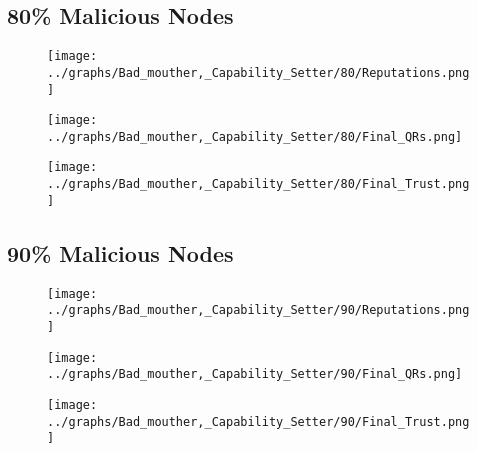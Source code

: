 \documentclass{article}
\begin{document}
  \begin{minipage}[t]{0.49\columnwidth}
    \subsection*{80\% Malicious Nodes}
        \begin{figure}[H]
            \centering
            \texttt{[image: ../graphs/Bad\_mouther,\_Capability\_Setter/80/Reputations.png]}
        \end{figure}
        \begin{figure}[H]
            \centering
            \texttt{[image: ../graphs/Bad\_mouther,\_Capability\_Setter/80/Final\_QRs.png]}
        \end{figure}
    \end{minipage}
    \begin{minipage}[t]{0.49\columnwidth}
        \begin{figure}[H]
            \centering
            \texttt{[image: ../graphs/Bad\_mouther,\_Capability\_Setter/80/Final\_Trust.png]}
        \end{figure}
    \end{minipage}

    \begin{minipage}[t]{0.49\columnwidth}
    \subsection*{90\% Malicious Nodes}
        \begin{figure}[H]
            \centering
            \texttt{[image: ../graphs/Bad\_mouther,\_Capability\_Setter/90/Reputations.png]}
        \end{figure}
        \begin{figure}[H]
            \centering
            \texttt{[image: ../graphs/Bad\_mouther,\_Capability\_Setter/90/Final\_QRs.png]}
        \end{figure}
    \end{minipage}
    \begin{minipage}[t]{0.49\columnwidth}
        \begin{figure}[H]
            \centering
            \texttt{[image: ../graphs/Bad\_mouther,\_Capability\_Setter/90/Final\_Trust.png]}
        \end{figure}
    \end{minipage}
    \newpage
\end{document}
